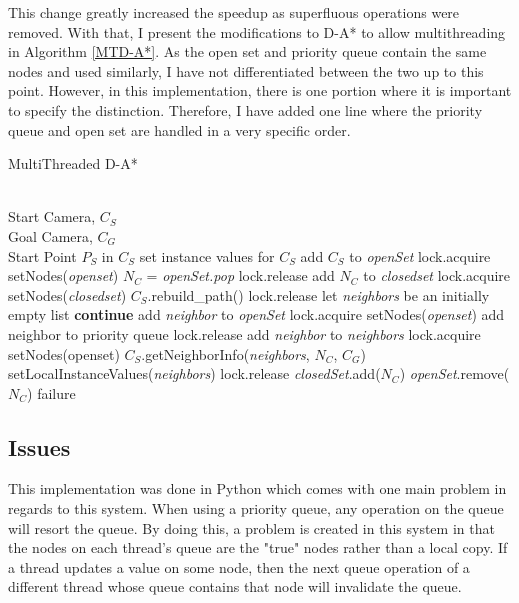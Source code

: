 This change greatly increased the speedup as superfluous operations were removed. With that, I present the modifications to D-A* to allow multithreading in Algorithm \ref{MTD-A*}. As the open set and priority queue contain the same nodes and used similarly, I have not differentiated between the two up to this point. However, in this implementation, there is one portion where it is important to specify the distinction. Therefore, I have added one line where the priority queue and open set are handled in a very specific order.


\begin{algorithm}
\caption{MultiThreaded D-A*}
\label{MTD-A*}
\begin{algorithmic}[1]
\REQUIRE \ \\
Start Camera, $C_S$ \\
Goal Camera, $C_G$ \\
Start Point $P_S$ in $C_S$
\STATE set instance values for $C_S$
\STATE add $C_S$ to \textit{openSet}
	\STATE lock.acquire
	\STATE setNodes(\textit{openset})
	\STATE \textit{$N_C$} = \textit{openSet.pop}
	\STATE lock.release
		\STATE add $N_C$ to \textit{closedset}
		\STATE lock.acquire
		\STATE setNodes(\textit{closedset})
		\RETURN $C_S$.rebuild\_path()
		\STATE lock.release
	\ENDIF
	\STATE let \textit{neighbors} be an initially empty list
		\STATE \textbf{continue}
	\ENDIF
		\STATE add \textit{neighbor} to \textit{openSet}
		\STATE lock.acquire
		\STATE setNodes(\textit{openset})
		\STATE add neighbor to priority queue
		\STATE lock.release
	\ENDIF
	\STATE add \textit{neighbor} to \textit{neighbors}
\ENDFOR	
\STATE lock.acquire
\STATE setNodes(openset)	 
\STATE $C_S$.getNeighborInfo(\textit{neighbors}, $N_C$, $C_G$)
\STATE setLocalInstanceValues(\textit{neighbors})
\STATE lock.release
\STATE \textit{closedSet}.add(\textit{$N_C$})
\STATE \textit{openSet}.remove(\textit{$N_C$})
\ENDWHILE
\RETURN failure
\end{algorithmic}
\end{algorithm}

\subsection{Issues}
This implementation was done in Python which comes with one main problem in regards to this system. When using a priority queue, any operation on the queue will resort the queue. By doing this, a problem is created in this system in that the nodes on each thread's queue are the "true" nodes rather than a local copy. If a thread updates a value on some node, then the next queue operation of a different thread whose queue contains that node will invalidate the queue.

